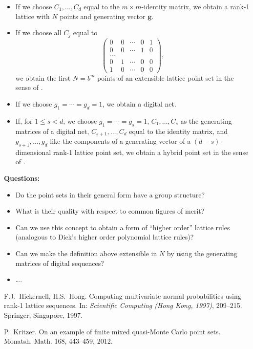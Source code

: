 \documentclass[11pt,a4paper]{article}
\newcommand{\bsg}{\boldsymbol{g}}
\begin{document}
\begin{itemize}
\item If we choose $C_1,\ldots,C_d$ equal to the $m\times m$-identity matrix, we obtain a rank-1 lattice with $N$ points 
and generating vector $\bsg$. 
\item If we choose all $C_j$ equal to
$$
 \begin{pmatrix}
  0 &0 & \cdots & 0 & 1\\
  0 & 0&\cdots & 1 & 0\\
  \hdots\\
  0 & 1 & \cdots & 0 & 0 \\
  1 & 0 & \cdots & 0 & 0 
 \end{pmatrix},
$$
we obtain the first $N=b^m$ points of an extensible lattice point set in the sense of \cite{HH97}. 

\item If we choose $g_1=\cdots=g_d=1$, we obtain a digital net. 

\item If, for $1\le s< d$, we choose $g_1=\cdots=g_s=1$, $C_1,\ldots,C_s$ as the generating matrices of a digital net, 
$C_{s+1},\ldots, C_d$ equal to the identity matrix, and $g_{s+1},\ldots,g_d$ like the components of a generating vector 
of a $(d-s)$-dimensional rank-1 lattice point set, we obtain a hybrid point set in the sense of \cite{K12}. 
\end{itemize}


\medskip

\textbf{Questions:}

\begin{itemize}
 \item Do the point sets in their general form have a group structure?
 \item What is their quality with respect to common figures of merit?
 \item Can we use this concept to obtain a form of ``higher order'' lattice rules (analogous to Dick's higher order polynomial lattice rules)? 
 \item Can we make the definition above extensible in $N$ by using the generating matrices of digital sequences? 
 \item \ldots.
\end{itemize}


\begin{thebibliography}{99}
  F.J.~Hickernell, H.S.~Hong. Computing multivariate normal probabilities using rank-1 lattice sequences. 
 In: \textit{Scientific Computing (Hong Kong, 1997)}, 209--215. Springer, Singapore, 1997.
 
  P.~Kritzer. On an example of finite mixed quasi-Monte Carlo point sets. Monatsh. Math. 168, 443--459, 2012. 
\end{thebibliography}
\end{document}

